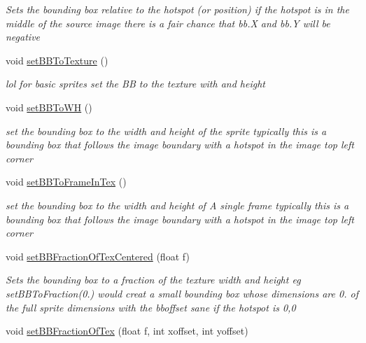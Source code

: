 \begin{DoxyCompactItemize}
\begin{DoxyCompactList}\small\item\em Sets the bounding box relative to the hotspot (or position) if the hotspot is in the middle of the source image there is a fair chance that bb.\+X and bb.\+Y will be negative \end{DoxyCompactList}\item 
void \mbox{\hyperlink{class_r_c___framework_1_1_sprite3_a352f91941f5ca2df898d966564e4c875}{set\+B\+B\+To\+Texture}} ()
\begin{DoxyCompactList}\small\item\em lol for basic sprites set the BB to the texture with and height \end{DoxyCompactList}\item 
void \mbox{\hyperlink{class_r_c___framework_1_1_sprite3_aca02729a3919f4f31c4c63f814ea0150}{set\+B\+B\+To\+WH}} ()
\begin{DoxyCompactList}\small\item\em set the bounding box to the width and height of the sprite typically this is a bounding box that follows the image boundary with a hotspot in the image top left corner \end{DoxyCompactList}\item 
void \mbox{\hyperlink{class_r_c___framework_1_1_sprite3_a820e5316676eee1ef5fccdc9ac07cf15}{set\+B\+B\+To\+Frame\+In\+Tex}} ()
\begin{DoxyCompactList}\small\item\em set the bounding box to the width and height of A single frame typically this is a bounding box that follows the image boundary with a hotspot in the image top left corner \end{DoxyCompactList}\item 
void \mbox{\hyperlink{class_r_c___framework_1_1_sprite3_ad599fbce8c9402618ead1232fc9d0539}{set\+B\+B\+Fraction\+Of\+Tex\+Centered}} (float f)
\begin{DoxyCompactList}\small\item\em Sets the bounding box to a fraction of the texture width and height eg set\+B\+B\+To\+Fraction(0.) would creat a small bounding box whose dimensions are 0. of the full sprite dimensions with the bboffset sane if the hotspot is 0,0 \end{DoxyCompactList}\item 
void \mbox{\hyperlink{class_r_c___framework_1_1_sprite3_a899837f4fa3d7c5736a31b30de845707}{set\+B\+B\+Fraction\+Of\+Tex}} (float f, int xoffset, int yoffset)

\end{DoxyCompactItemize}
